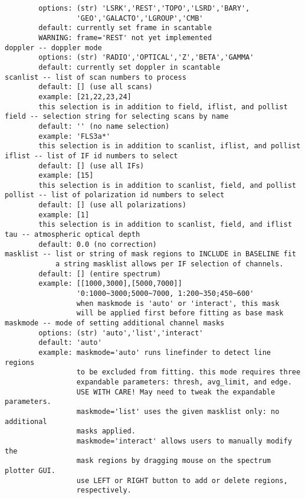 \begin{verbatim}
        options: (str) 'LSRK','REST','TOPO','LSRD','BARY',
                 'GEO','GALACTO','LGROUP','CMB'
        default: currently set frame in scantable
        WARNING: frame='REST' not yet implemented
doppler -- doppler mode
        options: (str) 'RADIO','OPTICAL','Z','BETA','GAMMA'
        default: currently set doppler in scantable
scanlist -- list of scan numbers to process
        default: [] (use all scans)
        example: [21,22,23,24]
        this selection is in addition to field, iflist, and pollist
field -- selection string for selecting scans by name
        default: '' (no name selection)
        example: 'FLS3a*'
        this selection is in addition to scanlist, iflist, and pollist
iflist -- list of IF id numbers to select
        default: [] (use all IFs)
        example: [15]
        this selection is in addition to scanlist, field, and pollist
pollist -- list of polarization id numbers to select
        default: [] (use all polarizations)
        example: [1]
        this selection is in addition to scanlist, field, and iflist
tau -- atmospheric optical depth
        default: 0.0 (no correction)
masklist -- list or string of mask regions to INCLUDE in BASELINE fit
            a string masklist allows per IF selection of channels.
        default: [] (entire spectrum)
        example: [[1000,3000],[5000,7000]]
                 '0:1000~3000;5000~7000, 1:200~350;450~600'
                 when maskmode is 'auto' or 'interact', this mask 
                 will be applied first before fitting as base mask
maskmode -- mode of setting additional channel masks
        options: (str) 'auto','list','interact'
        default: 'auto'
        example: maskmode='auto' runs linefinder to detect line regions 
                 to be excluded from fitting. this mode requires three 
                 expandable parameters: thresh, avg_limit, and edge.
                 USE WITH CARE! May need to tweak the expandable parameters.
                 maskmode='list' uses the given masklist only: no additional 
                 masks applied.
                 maskmode='interact' allows users to manually modify the 
                 mask regions by dragging mouse on the spectrum plotter GUI.
                 use LEFT or RIGHT button to add or delete regions, 
                 respectively.
       

\end{verbatim}
